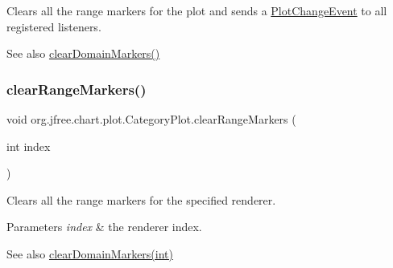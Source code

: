 Clears all the range markers for the plot and sends a \mbox{\hyperlink{}{Plot\+Change\+Event}} to all registered listeners.

\begin{DoxySeeAlso}{See also}
\mbox{\hyperlink{classorg_1_1jfree_1_1chart_1_1plot_1_1_category_plot_adf28326359bc5e6dd6a3584db74629c7}{clear\+Domain\+Markers()}} 
\end{DoxySeeAlso}
\mbox{\label{classorg_1_1jfree_1_1chart_1_1plot_1_1_category_plot_a2bf4600bbed1d743d9975c18b038c29e}} 
\subsubsection{\texorpdfstring{clear\+Range\+Markers()}{clearRangeMarkers()}\hspace{0.1cm}{\footnotesize\ttfamily [2/2]}}
{\footnotesize\ttfamily void org.\+jfree.\+chart.\+plot.\+Category\+Plot.\+clear\+Range\+Markers (\begin{DoxyParamCaption}\item[{int}]{index }\end{DoxyParamCaption})}

Clears all the range markers for the specified renderer.


\begin{DoxyParams}{Parameters}
{\em index} & the renderer index.\\
\hline
\end{DoxyParams}
\begin{DoxySeeAlso}{See also}
\mbox{\hyperlink{classorg_1_1jfree_1_1chart_1_1plot_1_1_category_plot_a32b248b8669388ee35fead74182cd8d0}{clear\+Domain\+Markers(int)}} 
\end{DoxySeeAlso}
\mbox{\label{classorg_1_1jfree_1_1chart_1_1plot_1_1_category_plot_a386a09d10866ec306dabb6537bff62c9}} 
